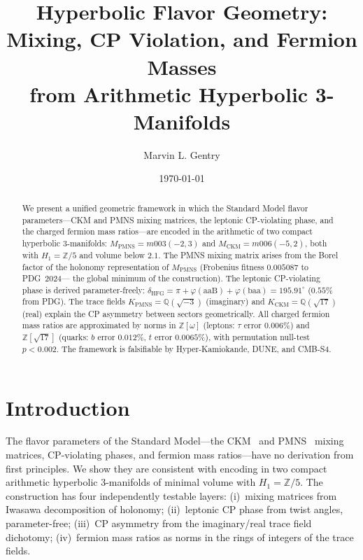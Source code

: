 \documentclass[11pt,a4paper]{article}
\theoremstyle{definition}
\theoremstyle{remark}
\newcommand{\Zfive}{\mathbb{Z}/5}
\newcommand{\MPMNS}{M_{\mathrm{PMNS}}}
\newcommand{\MCKM}{M_{\mathrm{CKM}}}
\newcommand{\KPMNS}{K_{\mathrm{PMNS}}}
\newcommand{\KCKM}{K_{\mathrm{CKM}}}
\newcommand{\Zom}{\mathbb{Z}[\omega]}
\newcommand{\Zsev}{\mathbb{Z}[\sqrt{17}]}
\begin{document}
\title{Hyperbolic Flavor Geometry:\\
Mixing, CP Violation, and Fermion Masses\\
from Arithmetic Hyperbolic 3-Manifolds}

\author[1]{Marvin L. Gentry}
\date{\today}
\maketitle

\begin{abstract}
We present a unified geometric framework in which the Standard Model
flavor parameters---CKM and PMNS mixing matrices, the leptonic
CP-violating phase, and the charged fermion mass ratios---are encoded
in the arithmetic of two compact hyperbolic 3-manifolds:
$\MPMNS = m003(-2,3)$ and $\MCKM = m006(-5,2)$,
both with $H_1 = \Zfive$ and volume below $2.1$.
The PMNS mixing matrix arises from the Borel factor of the holonomy
representation of $\MPMNS$ (Frobenius fitness $0.005087$ to PDG~2024---
the global minimum of the construction).
The leptonic CP-violating phase is derived parameter-freely:
$\delta_{\mathrm{HFG}} = \pi + \varphi(\mathrm{aaB}) + \varphi(\mathrm{baa})
= 195.91^\circ$ ($0.55\%$ from PDG).
The trace fields $\KPMNS = \mathbb{Q}(\sqrt{-3})$ (imaginary) and
$\KCKM = \mathbb{Q}(\sqrt{17})$ (real) explain the CP asymmetry
between sectors geometrically.
All charged fermion mass ratios are approximated by norms in
$\Zom$ (leptons: $\tau$ error $0.006\%$) and $\Zsev$
(quarks: $b$ error $0.012\%$, $t$ error $0.0065\%$),
with permutation null-test $p<0.002$.
The framework is falsifiable by Hyper-Kamiokande, DUNE, and CMB-S4.
\end{abstract}

\tableofcontents

\section{Introduction}
\label{sec:intro}

The flavor parameters of the Standard Model---the CKM~\cite{Kobayashi}
and PMNS~\cite{Maki} mixing matrices, CP-violating phases, and fermion
mass ratios---have no derivation from first principles.
We show they are consistent with encoding in two compact arithmetic
hyperbolic 3-manifolds of minimal volume with $H_1 = \Zfive$.
The construction has four independently testable layers:
(i)~mixing matrices from Iwasawa decomposition of holonomy;
(ii)~leptonic CP phase from twist angles, parameter-free;
(iii)~CP asymmetry from the imaginary/real trace field dichotomy;
(iv)~fermion mass ratios as norms in the rings of integers of the trace fields.
\end{document}
